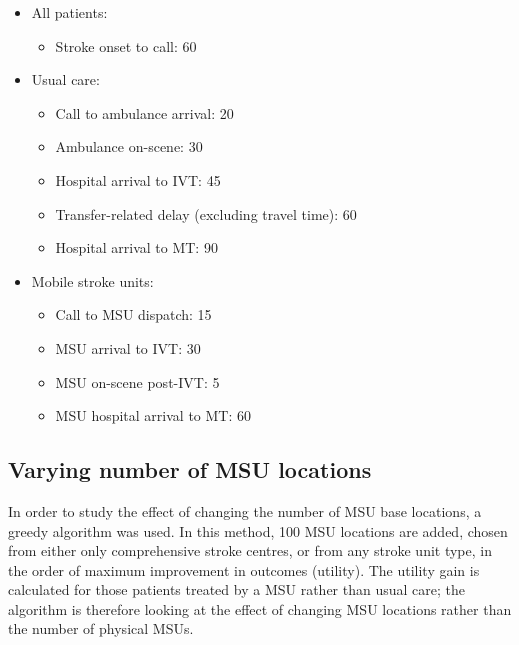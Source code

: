 \begin{minipage}{1.0\textwidth}  %
\begin{spacing}{1.2}
\begin{itemize}
    \item All patients:
    \begin{itemize}
        \item Stroke onset to call: 60
    \end{itemize}
    \item Usual care:
    \begin{itemize}
        \item Call to ambulance arrival: 20
        \item Ambulance on-scene: 30
        \item Hospital arrival to IVT: 45
        \item Transfer-related delay (excluding travel time): 60
        \item Hospital arrival to MT: 90
    \end{itemize}
    \item Mobile stroke units:
    \begin{itemize}
        \item Call to MSU dispatch: 15
        \item MSU arrival to IVT: 30
        \item MSU on-scene post-IVT: 5
        \item MSU hospital arrival to MT: 60
    \end{itemize}
\end{itemize}
\end{spacing}
\end{minipage}


\subsection{Varying number of MSU locations}

In order to study the effect of changing the number of MSU base locations, a greedy algorithm was used. In this method, 100 MSU locations are added, chosen from either only comprehensive stroke centres, or from any stroke unit type, in the order of maximum improvement in outcomes (utility). The utility gain is calculated for those patients treated by a MSU rather than usual care; the algorithm is therefore looking at the effect of changing MSU locations rather than the number of physical MSUs.